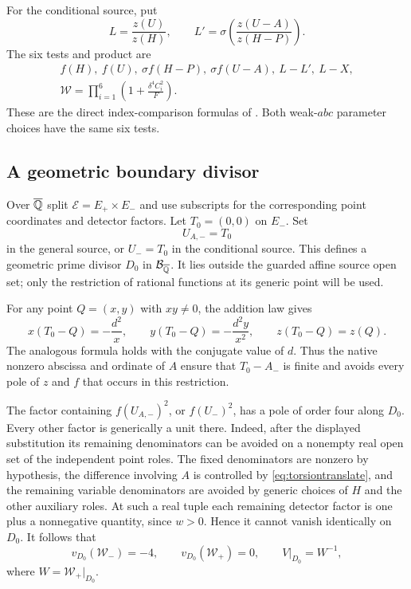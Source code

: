\documentclass[11pt,a4paper]{article}
\theoremstyle{remark}\newtheorem{remark}[theorem]{Remark}
\begin{document}
For the conditional source, put
\[
 L=\frac{z(U)}{z(H)},\qquad
 L'=\sigma\left(\frac{z(U-A)}{z(H-P)}\right).
\]
The six tests and product are
\begin{equation}\label{eq:conditionalW}
\begin{gathered}
 f(H),\ f(U),\ \sigma f(H-P),\ \sigma f(U-A),\ L-L',\ L-X,\\
 \mathcal W=\prod_{i=1}^{6}\left(1+\frac{\delta^4C_i^2}{F}\right).
\end{gathered}
\end{equation}
These are the direct index-comparison formulas of
\cite{Direct,UnitNorm}. Both weak-$abc$ parameter choices have the
same six tests.

\subsection{A geometric boundary divisor}

Over $\overline{\mathbb Q}$ split $\mathcal E=E_+\times E_-$ and use subscripts
for the corresponding point coordinates and detector factors.
Let $T_0=(0,0)$ on $E_-$. Set
\[
                 U_{A,-}=T_0
\]
in the general source, or $U_-=T_0$ in the conditional source.
This defines a geometric prime divisor $D_0$ in $\mathcal B_{\overline{\mathbb Q}}$.
It lies outside the guarded affine source open set; only the
restriction of rational functions at its generic point will be used.

For any point $Q=(x,y)$ with $xy\ne0$, the addition law gives
\begin{equation}\label{eq:torsiontranslate}
 x(T_0-Q)=-\frac{d^2}{x},\qquad
 y(T_0-Q)=-\frac{d^2y}{x^2},\qquad
 z(T_0-Q)=z(Q).
\end{equation}
The analogous formula holds with the conjugate value of $d$.
Thus the native nonzero abscissa and ordinate of $A$ ensure that
$T_0-A_-$ is finite and avoids every pole of $z$ and $f$ that
occurs in this restriction.

The factor containing $f(U_{A,-})^2$, or $f(U_-)^2$, has a pole
of order four along $D_0$. Every other factor is generically a unit
there. Indeed, after the displayed substitution its remaining
denominators can be avoided on a nonempty real open set of the
independent point roles. The fixed denominators are nonzero by
hypothesis, the difference involving $A$ is controlled by
\eqref{eq:torsiontranslate}, and the remaining variable denominators
are avoided by generic choices of $H$ and the other auxiliary roles.
At such a real tuple each remaining detector factor is one plus a
nonnegative quantity, since $w>0$. Hence it cannot vanish
identically on $D_0$. It follows that
\begin{equation}\label{eq:residue}
 v_{D_0}(\mathcal W_-)=-4,\qquad
 v_{D_0}(\mathcal W_+)=0,\qquad
                 V|_{D_0}=W^{-1},
\end{equation}
where $W=\mathcal W_+|_{D_0}$.
\end{document}
